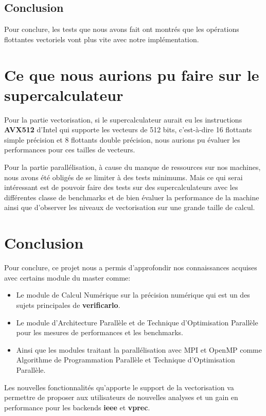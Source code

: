 \documentclass[12pt, letterpaper]{article}
\begin{document}
\subsection{Conclusion}
\label{sec:orgb4d2913}

Pour conclure, les tests que nous avons fait ont montrés que les opérations
flottantes vectoriels vont plus vite avec notre implémentation.

\section{Ce que nous aurions pu faire sur le supercalculateur}
\label{sec:orgb902640}

Pour la partie vectorisation, si le supercalculateur aurait eu les
instructions \textbf{AVX512} d'Intel qui supporte les vecteurs de 512 bits,
c'est-à-dire 16 flottants simple précision et 8 flottants double précision,
nous aurions pu évaluer les performances pour ces tailles de vecteurs.

Pour la partie parallélisation, à cause du manque de ressources sur nos
machines, nous avons été obligés de se limiter à des tests minimums. Mais ce
qui serai intéressant est de pouvoir faire des tests sur des supercalculateurs
avec les différentes classe de benchmarks et de bien évaluer la performance de
la machine ainsi que d'observer les niveaux de vectorisation sur une grande
taille de calcul.

\section{Conclusion}
\label{sec:org901822b}

Pour conclure, ce projet nous a permis d'approfondir nos connaissances acquises
avec certains module du master comme:
\begin{itemize}
\item Le module de Calcul Numérique sur la précision numérique qui est un des sujets
principales de \textbf{verificarlo}.
\item Le module d'Architecture Parallèle et de Technique d'Optimisation Parallèle
pour les mesures de performances et les benchmarks.
\item Ainsi que les modules traitant la parallélisation avec MPI et OpenMP comme
Algorithme de Programmation Parallèle et Technique d'Optimisation Parallèle.
\end{itemize}

Les nouvelles fonctionnalités qu'apporte le support de la vectorisation va
permettre de proposer aux utilisateurs de nouvelles analyses et un gain en
performance pour les backends \textbf{ieee} et \textbf{vprec}.
\end{document}
